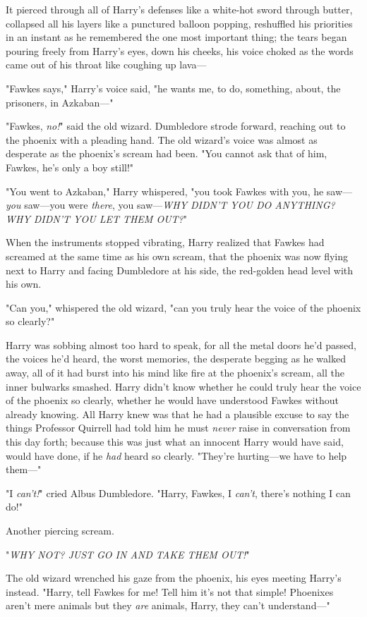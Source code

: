 It pierced through all of Harry's defenses like a white-hot sword through
butter, collapsed all his layers like a punctured balloon popping, reshuffled
his priorities in an instant as he remembered the one most important thing; the
tears began pouring freely from Harry's eyes, down his cheeks, his voice choked
as the words came out of his throat like coughing up lava---

"Fawkes says," Harry's voice said, "he wants me, to do, something, about, the
prisoners, in Azkaban---"

"Fawkes, \emph{no!}" said the old wizard. Dumbledore strode forward, reaching
out to the phoenix with a pleading hand. The old wizard's voice was almost as
desperate as the phoenix's scream had been. "You cannot ask that of him,
Fawkes, he's only a boy still!"

"You went to Azkaban," Harry whispered, "you took Fawkes with you, he
saw---\emph{you} saw---you were \emph{there}, you saw---\emph{WHY DIDN'T YOU DO
ANYTHING? WHY DIDN'T YOU LET THEM OUT?}"

When the instruments stopped vibrating, Harry realized that Fawkes had screamed
at the same time as his own scream, that the phoenix was now flying next to
Harry and facing Dumbledore at his side, the red-golden head level with his own.

"Can you," whispered the old wizard, "can you truly hear the voice of the
phoenix so clearly?"

Harry was sobbing almost too hard to speak, for all the metal doors he'd
passed, the voices he'd heard, the worst memories, the desperate begging as he
walked away, all of it had burst into his mind like fire at the phoenix's
scream, all the inner bulwarks smashed. Harry didn't know whether he could
truly hear the voice of the phoenix so clearly, whether he would have
understood Fawkes without already knowing. All Harry knew was that he had a
plausible excuse to say the things Professor Quirrell had told him he must
\emph{never} raise in conversation from this day forth; because this was just
what an innocent Harry would have said, would have done, if he \emph{had} heard
so clearly. "They're hurting---we have to help them---"

"I \emph{can't!}" cried Albus Dumbledore. "Harry, Fawkes, I \emph{can't},
there's nothing I can do!"

Another piercing scream.

"\emph{WHY NOT? JUST GO IN AND TAKE THEM OUT!}"

The old wizard wrenched his gaze from the phoenix, his eyes meeting Harry's
instead. "Harry, tell Fawkes for me! Tell him it's not that simple! Phoenixes
aren't mere animals but they \emph{are} animals, Harry, they can't
understand---"

